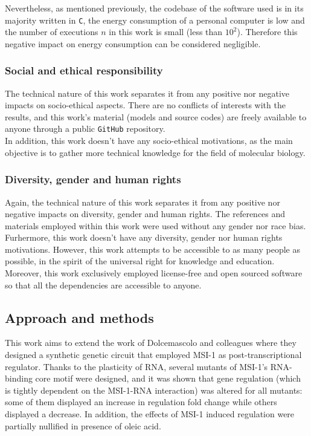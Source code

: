 Nevertheless, as mentioned previously, the codebase of the software used is in its majority written in \texttt{C}, the energy consumption of a personal computer is low and the number of executions $n$ in this work is small (less than $10^2$). Therefore this negative impact on energy consumption can be considered negligible.

\subsubsection{Social and ethical responsibility}

The technical nature of this work separates it from any positive nor negative impacts on socio-ethical aspects. There are no conflicts of interests with the results, and this work's material (models and source codes) are freely available to anyone through a public \texttt{GitHub} repository.\\

In addition, this work doesn't have any socio-ethical motivations, as the main objective is to gather more technical knowledge for the field of molecular biology.


\subsubsection{Diversity, gender and human rights}

Again, the technical nature of this work separates it from any positive nor negative impacts on diversity, gender and human rights. The references and materials employed within this work were used without any gender nor race bias.\\

Furhermore, this work doesn't have any diversity, gender nor human rights motivations. However, this work attempts to be accessible to as many people as possible, in the spirit of the universal right for knowledge and education. Moreover, this work exclusively employed license-free and open sourced software so that all the dependencies are accessible to anyone.

\subsection{Approach and methods}

This work aims to extend the work of Dolcemascolo and colleagues \cite{dolcemascolo_2022} where they designed a synthetic genetic circuit that employed MSI-1 as post-transcriptional regulator. Thanks to the plasticity of RNA, several mutants of MSI-1's RNA-binding core motif were designed, and it was shown that gene regulation (which is tightly dependent on the MSI-1-RNA interaction) was altered for all mutants: some of them displayed an increase in regulation fold change while others displayed a decrease. In addition, the effects of MSI-1 induced regulation were partially nullified in presence of oleic acid.\\

